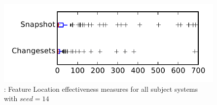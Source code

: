 
\begin{figure}
\centering
\includegraphics[height=0.4\textheight]{figures/flt_seed/rq1_tiny_14}
\caption{\rone: Feature Location effectiveness measures for all subject systems with $seed=14$}
\label{fig:flt_seed:rq1:tiny}
\end{figure}
